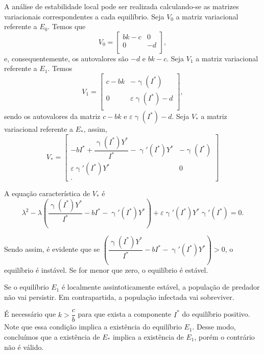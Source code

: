 \documentclass{article}
\begin{document}
A análise de estabilidade local pode ser realizada calculando-se as matrizes variacionais correspondentes a cada equilíbrio. Seja $V_0$ a matriz variacional referente a $E_0$. Temos que  
\begin{equation*}
    V_0 = 
    \begin{bmatrix}
        bk - c & 0 \\
        0 & -d \\
    \end{bmatrix},
\end{equation*}
e, consequentemente, os autovalores são $-d$ e $bk - c$. Seja $V_1$ a matriz variacional referente a $E_1$. Temos 
\begin{equation*}
    V_1 = 
    \begin{bmatrix}
        c - bk & - \upgamma(I^*) \\ 
        0 & \varepsilon \upgamma(I^*) - d \\
    \end{bmatrix},
\end{equation*}
sendo os autovalores da matriz $c-bk$ e $\varepsilon \upgamma(I^*) - d$. Seja $V_*$ a matriz variacional referente a $E_*$, assim,
\begin{equation*}
    V_* =
    \begin{bmatrix}
        - b I^* + \dfrac{\upgamma(I^*)Y^*}{I^*} - \upgamma'(I^*) Y^* & -\upgamma(I^*) \\
        \varepsilon \upgamma'(I^*)Y^* & 0 \\.
    \end{bmatrix}
\end{equation*}

A equação característica de $V_*$ é 
\begin{equation*}
    \lambda^2 - \lambda \left( \dfrac{\upgamma(I^*)Y^*}{I^*} - b I^* -  \upgamma'(I^*) Y^* \right) + \varepsilon \upgamma'(I^*)Y^*\upgamma'(I^*) = 0.
\end{equation*}

Sendo assim, é evidente que se $\left( \dfrac{\upgamma(I^*)Y^*}{I^*} - b I^* -  \upgamma'(I^*) Y^* \right) > 0$, o equilíbrio é instável. Se for menor que zero, o equilíbrio é estável.

Se o equilíbrio $E_1$ é localmente assintoticamente estável, a população de predador não vai persistir. Em contrapartida, a população infectada vai sobreviver. 

É necessário que $k > \dfrac{c}{b}$ para que exista a componente $I^*$ do equilíbrio positivo. Note que essa condição implica a existência do equilíbrio $E_1$. Desse modo, concluímos que a existência de $E_*$ implica a existência de $E_1$, porém o contrário não é válido.
\end{document}
